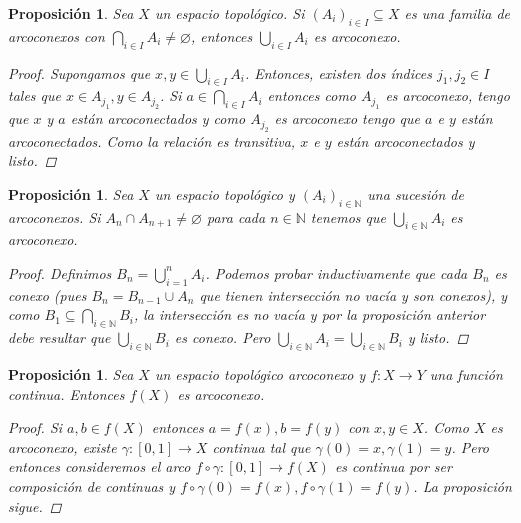 \documentclass[12pt]{book}
\newtheorem{prop}[teo]{Proposición}
\theoremstyle{definition}
\newcommand{\NN}{\mathbb{N}}
\let\emptyset\varnothing
\begin{document}
\begin{prop}
Sea $X$ un espacio topológico. Si $(A_i)_{i\in I}\subseteq X$ es una familia de arcoconexos con $\displaystyle\bigcap_{i\in I}A_i\neq\emptyset$, entonces $\displaystyle\bigcup_{i\in I}A_i$ es arcoconexo.
\begin{proof}
Supongamos que $x,y\in \displaystyle\bigcup_{i\in I}A_i$. Entonces, existen dos índices $j_1,j_2\in I$ tales que $x\in A_{j_1}, y\in A_{j_2}$. Si $a\in \displaystyle\bigcap_{i\in I}A_i$ entonces como $A_{j_1}$ es arcoconexo, tengo que $x$ y $a$ están arcoconectados y como $A_{j_2}$ es arcoconexo tengo que $a$ e $y$ están arcoconectados. Como la relación es transitiva, $x$ e $y$ están arcoconectados y listo.
\end{proof}
\end{prop}

\begin{prop}
Sea $X$ un espacio topológico y $(A_i)_{i\in\NN}$ una sucesión de arcoconexos. Si $A_n\cap A_{n+1}\neq\emptyset$ para cada $n\in\NN$ tenemos que $\displaystyle\bigcup_{i\in \NN}A_i$ es arcoconexo.
\begin{proof}
Definimos $B_n = \displaystyle\bigcup_{i=1}^n A_i$. Podemos probar inductivamente que cada $B_n$ es conexo (pues $B_n = B_{n-1}\cup A_n$ que tienen intersección no vacía y son conexos), y como $B_1\subseteq \displaystyle\bigcap_{i\in \NN}B_i$, la intersección es no vacía y por la proposición anterior debe resultar que $\displaystyle\bigcup_{i\in\NN}B_i$ es conexo. Pero $\displaystyle\bigcup_{i\in\NN}A_i = \displaystyle\bigcup_{i\in\NN}B_i$ y listo.
\end{proof}
\end{prop}

\begin{prop}
Sea $X$ un espacio topológico arcoconexo y $f:X\to Y$ una función continua. Entonces $f(X)$ es arcoconexo.
\begin{proof}
Si $a,b\in f(X)$ entonces $a=f(x), b=f(y)$ con $x,y\in X$. Como $X$ es arcoconexo, existe $\gamma:[0,1]\to X$ continua tal que $\gamma(0)=x, \gamma(1)=y$. Pero entonces consideremos el arco $f\circ\gamma:[0,1]\to f(X)$ es continua por ser composición de continuas y $f\circ\gamma(0)=f(x),f\circ\gamma(1)=f(y)$. La proposición sigue.
\end{proof}
\end{prop}
\end{document}
